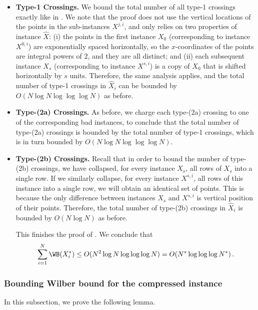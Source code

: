 \documentclass{toc}
\begin{document}
\begin{itemize}
    \item {\bf Type-1 Crossings.}
We bound the total number of all type-1 crossings exactly like in . We note that the proof does not use the vertical locations of the points in the sub-instances $X^{j,i}$, and only relies on two properties of instance $\hat X$: (i) the points in the first instance $X_0$ (corresponding to instance $X^{0,i}$) are exponentially spaced horizontally, so the $x$-coordinates of the points are integral powers of $2$, and they are all distinct; and (ii) each subsequent instance $X_s$ (corresponding to instance $X^{s,i}$) is a copy of $X_0$ that is shifted horizontally by $s$ units. Therefore, the same analysis applies, and the total number of type-1 crossings in $\hat X_i$ can be bounded by $O(N\log N\log\log\log N)$ as before.

\item {\bf Type-(2a) Crossings.}
As before, we charge each type-(2a) crossing to one of the corresponding bad instances, to conclude that the total number of type-(2a) crossings is bounded by the total number of type-1 crossings, which is in turn bounded by $O(N\log N\log\log\log N)$.

\item  {\bf Type-(2b) Crossings.}
Recall that in order to bound the number of type-(2b) crossings, we have collapsed, for every instance $X_s$, all rows of $X_s$ into a single row. If we similarly collapse, for every instance $X^{s,i}$, all rows of this instance into a single row, we will obtain an identical set of points. This is because the only difference between instances $X_s$ and $X^{s,i}$ is vertical position of their points. Therefore, the total number of type-(2b) crossings in $\hat X_i$ is bounded by $O(N\log N)$ as before.

This finishes the proof of . We conclude that %
\begin{equation}
  \sum_{i=1}^N\WB(X_i^*)\leq O(N^2\log N\log\log\log N)=O(N^*\log\log\log N^*)\,.
\end{equation}
\end{itemize}







\subsubsection{Bounding Wilber bound for the compressed instance}
In this subsection, we prove the following lemma.
\end{document}

